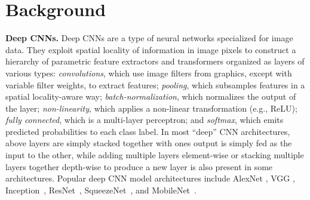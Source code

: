 \section{Background}

\vspace{2mm}
\noindent \textbf{Deep CNNs.} Deep CNNs are a type of neural networks specialized for image data.
They exploit spatial locality of information in image pixels to construct a hierarchy of parametric feature extractors and transformers organized as layers of various types: \textit{convolutions}, which use image
filters from graphics, except with variable filter weights, to extract features; \textit{pooling}, which subsamples features in a spatial
locality-aware way; \textit{batch-normalization}, which normalizes the output of the layer; \textit{non-linearity}, which applies a non-linear transformation (e.g., ReLU); \textit{fully connected}, which is a multi-layer perceptron; and \textit{softmax}, which emits predicted probabilities to each class label.
In most ``deep'' CNN architectures, above layers are simply stacked together with ones output is simply fed as the input to the other, while adding multiple layers element-wise or stacking multiple layers together depth-wise to produce a new layer is also present in some architectures.
Popular deep CNN model architectures include AlexNet \cite{alexnet}, VGG \cite{vggnet}, Inception~\cite{inception}, ResNet~\cite{resnet}, SqueezeNet~\cite{squeezenet}, and MobileNet~\cite{mobilenets}.

